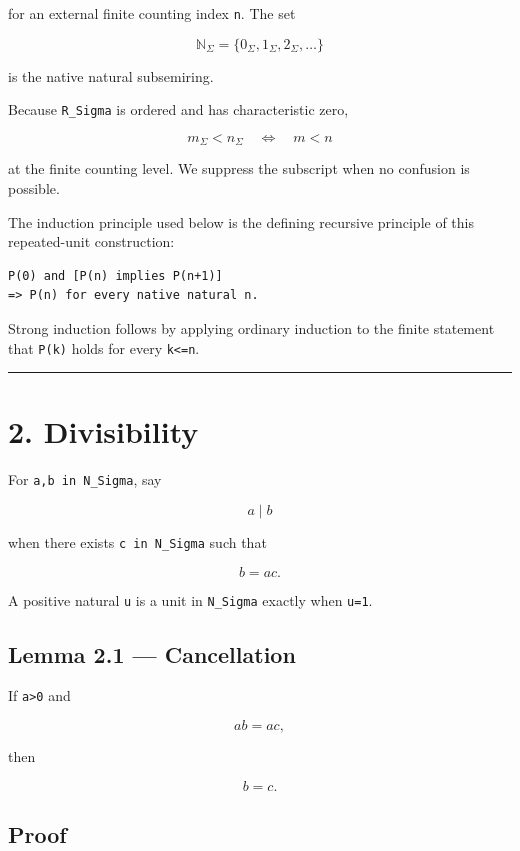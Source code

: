for an external finite counting index \texttt{n}. The set

\[
\mathbb N_\Sigma
=
\{0_\Sigma,1_\Sigma,2_\Sigma,\ldots\}
\]

is the native natural subsemiring.

Because \texttt{R\_Sigma} is ordered and has characteristic zero,

\[
m_\Sigma<n_\Sigma
\quad\Longleftrightarrow\quad
m<n
\]

at the finite counting level. We suppress the subscript when no confusion is
possible.

The induction principle used below is the defining recursive principle of this
repeated-unit construction:

\begin{verbatim}
P(0) and [P(n) implies P(n+1)]
=> P(n) for every native natural n.
\end{verbatim}

Strong induction follows by applying ordinary induction to the finite statement
that \texttt{P(k)} holds for every \texttt{k\textless{}=n}.

\begin{center}\rule{0.5\linewidth}{0.5pt}\end{center}

\hypertarget{divisibility}{%
\section{2. Divisibility}\label{divisibility}}

For \texttt{a,b\ in\ N\_Sigma}, say

\[
a\mid b
\]

when there exists \texttt{c\ in\ N\_Sigma} such that

\[
b=ac.
\]

A positive natural \texttt{u} is a unit in \texttt{N\_Sigma} exactly when \texttt{u=1}.

\hypertarget{lemma-2.1-cancellation}{%
\subsection{Lemma 2.1 --- Cancellation}\label{lemma-2.1-cancellation}}

If \texttt{a\textgreater{}0} and

\[
ab=ac,
\]

then

\[
b=c.
\]

\hypertarget{proof}{%
\subsection{Proof}\label{proof}}

